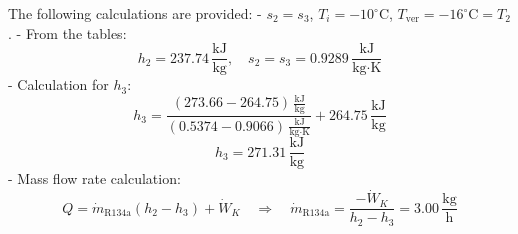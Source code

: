 The following calculations are provided:  
- \( s_2 = s_3 \), \( T_i = -10^\circ\text{C} \), \( T_{\text{ver}} = -16^\circ\text{C} = T_2 \).  
- From the tables:  
  \[
  h_2 = 237.74 \, \frac{\text{kJ}}{\text{kg}}, \quad s_2 = s_3 = 0.9289 \, \frac{\text{kJ}}{\text{kg·K}}
  \]  
- Calculation for \( h_3 \):  
  \[
  h_3 = \frac{(273.66 - 264.75) \, \frac{\text{kJ}}{\text{kg}}}{(0.5374 - 0.9066) \, \frac{\text{kJ}}{\text{kg·K}}} + 264.75 \, \frac{\text{kJ}}{\text{kg}}
  \]  
  \[
  h_3 = 271.31 \, \frac{\text{kJ}}{\text{kg}}
  \]  
- Mass flow rate calculation:  
  \[
  Q = \dot{m}_{\text{R134a}} (h_2 - h_3) + \dot{W}_K \quad \Rightarrow \quad \dot{m}_{\text{R134a}} = \frac{-\dot{W}_K}{h_2 - h_3} = 3.00 \, \frac{\text{kg}}{\text{h}}
  \]
